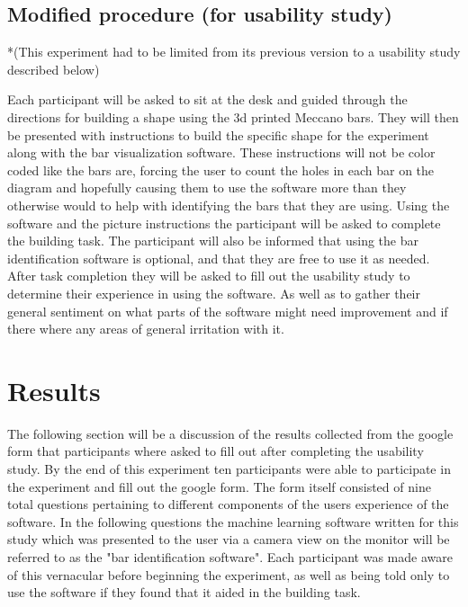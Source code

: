 \documentclass{vgtc}                          %
\begin{document}
\subsection{Modified procedure (for usability study)}

*(This experiment had to be limited from its previous version to a usability study described below)

Each participant will be asked to sit at the desk and guided through the directions for building a shape using the 3d printed Meccano bars. They will then be presented with instructions to build the specific shape for the experiment along with the bar visualization software. These instructions will not be color coded like the bars are, forcing the user to count the holes in each bar on the diagram and hopefully causing them to use the software more than they otherwise would to help with identifying the bars that they are using. Using the software and the picture instructions the participant will be asked to complete the building task. The participant will also be informed that using the bar identification software is optional, and that they are free to use it as needed. After task completion they will be asked to fill out the usability study to determine their experience in using the software. As well as to gather their general sentiment on what parts of the software might need improvement and if there where any areas of general irritation with it.







\section{Results}

The following section will be a discussion of the results collected from the google form that participants where asked to fill out after completing the usability study. By the end of this experiment ten participants were able to participate in the experiment and fill out the google form. The form itself consisted of nine total questions pertaining to different components of the users experience of the software. In the following questions the machine learning software written for this study which was presented to the user via a camera view on the monitor will be referred to as the "bar identification software". Each participant was made aware of this vernacular before beginning the experiment, as well as being told only to use the software if they found that it aided in the building task.
\end{document}
